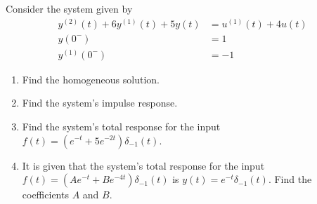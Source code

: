 \documentclass[fleqn, a4paper, 11pt, oneside]{amsart}
\theoremstyle{definition}
\theoremstyle{theorem}
\begin{document}
\begin{question}
	Consider the system given by
	\begin{align*}
		y^{(2)}(t) + 6 y^{(1)}(t) + 5 y(t) & = u^{(1)}(t) + 4 u(t) \\
		y(0^-)                             & = 1                   \\
		y^{(1)}(0^-)                       & = -1
	\end{align*}
	\begin{enumerate}
		\item
			Find the homogeneous solution.
		\item
			Find the system's impulse response.
		\item
			Find the system's total response for the input $f(t) = \left( e^{-t} + 5 e^{-2 t} \right) \delta_{-1}(t)$.
		\item
			It is given that the system's total response for the input $f(t) = \left( A e^{-t} + B e^{-4 t} \right) \delta_{-1}(t)$ is $y(t) = e^{-t} \delta_{-1}(t)$.
			Find the coefficients $A$ and $B$.
	\end{enumerate}
\end{question}
\end{document}

